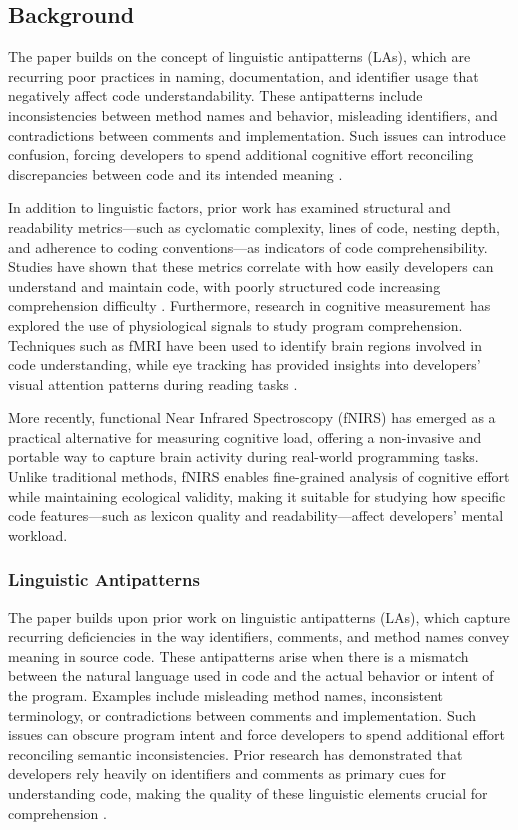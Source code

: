\subsection{Background}

The paper builds on the concept of linguistic antipatterns (LAs), which are recurring poor practices in naming, documentation, and identifier usage that negatively affect code understandability. These antipatterns include inconsistencies between method names and behavior, misleading identifiers, and contradictions between comments and implementation. Such issues can introduce confusion, forcing developers to spend additional cognitive effort reconciling discrepancies between code and its intended meaning \cite{Arnaoudova2013}.

In addition to linguistic factors, prior work has examined structural and readability metrics—such as cyclomatic complexity, lines of code, nesting depth, and adherence to coding conventions—as indicators of code comprehensibility. Studies have shown that these metrics correlate with how easily developers can understand and maintain code, with poorly structured code increasing comprehension difficulty \cite{BuseWeimer2010}. Furthermore, research in cognitive measurement has explored the use of physiological signals to study program comprehension. Techniques such as fMRI have been used to identify brain regions involved in code understanding, while eye tracking has provided insights into developers’ visual attention patterns during reading tasks \cite{Siegmund2014,Fritz2014}.

More recently, functional Near Infrared Spectroscopy (fNIRS) has emerged as a practical alternative for measuring cognitive load, offering a non-invasive and portable way to capture brain activity during real-world programming tasks. Unlike traditional methods, fNIRS enables fine-grained analysis of cognitive effort while maintaining ecological validity, making it suitable for studying how specific code features—such as lexicon quality and readability—affect developers’ mental workload.

\subsubsection{Linguistic Antipatterns}
The paper builds upon prior work on linguistic antipatterns (LAs), which capture recurring deficiencies in the way identifiers, comments, and method names convey meaning in source code. These antipatterns arise when there is a mismatch between the natural language used in code and the actual behavior or intent of the program. Examples include misleading method names, inconsistent terminology, or contradictions between comments and implementation. Such issues can obscure program intent and force developers to spend additional effort reconciling semantic inconsistencies. Prior research has demonstrated that developers rely heavily on identifiers and comments as primary cues for understanding code, making the quality of these linguistic elements crucial for comprehension \cite{Arnaoudova2013}.

